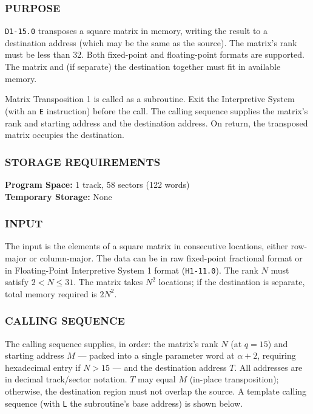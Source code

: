\subsubsection*{PURPOSE}
\texttt{D1-15.0} transposes a square matrix in memory, writing the result to a destination address (which may be the same as the source). The matrix's rank must be less than 32. Both fixed-point and floating-point formats are supported. The matrix and (if separate) the destination together must fit in available memory.

Matrix Transposition 1 is called as a subroutine. Exit the Interpretive System (with an \texttt{E} instruction) before the call. The calling sequence supplies the matrix's rank and starting address and the destination address. On return, the transposed matrix occupies the destination.

\subsubsection*{STORAGE REQUIREMENTS}
\textbf{Program Space:} 1 track, 58 sectors (122 words) \\
\textbf{Temporary Storage:} None

\subsubsection*{INPUT}
The input is the elements of a square matrix in consecutive locations, either row-major or column-major. The data can be in raw fixed-point fractional format or in Floating-Point Interpretive System 1 format (\texttt{H1-11.0}). The rank $N$ must satisfy $2 < N \le 31$. The matrix takes $N^2$ locations; if the destination is separate, total memory required is $2N^2$.

\subsubsection*{CALLING SEQUENCE}
The calling sequence supplies, in order: the matrix's rank $N$ (at $q=15$) and starting address $M$ --- packed into a single parameter word at $\alpha+2$, requiring hexadecimal entry if $N > 15$ --- and the destination address $T$. All addresses are in decimal track/sector notation. $T$ may equal $M$ (in-place transposition); otherwise, the destination region must not overlap the source. A template calling sequence (with \texttt{L} the subroutine's base address) is shown below.

